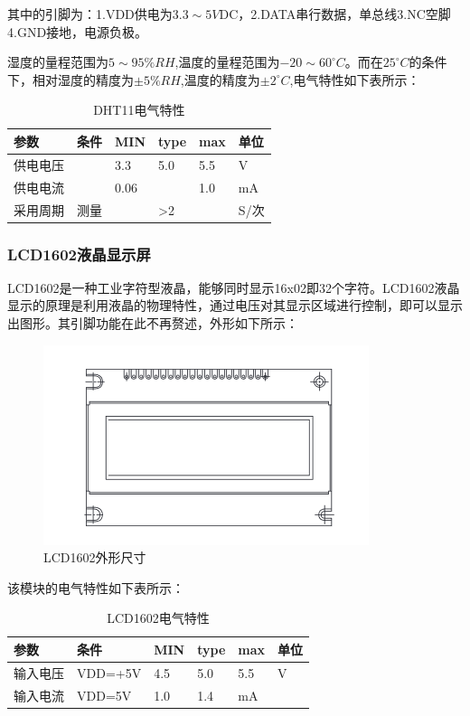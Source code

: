 \documentclass[a4paper, 11pt]{article} %
\begin{document}
\par{}其中的引脚为：1.VDD供电为$3.3\sim 5V$DC，2.DATA串行数据，单总线3.NC空脚4.GND接地，电源负极。
\par{} 湿度的量程范围为$5\sim 95 \%RH$,温度的量程范围为$-20\sim 60^{\circ}C$。而在$25^{\circ}C$的条件下，相对湿度的精度为$\pm 5\%RH$,温度的精度为$\pm 2^{\circ}C$,电气特性如下表所示：
\begin{table}[H]
  \centering
  \label{tab3}
  \begin{threeparttable}
    \small
    \begin{tabular} {p{70pt}p{70pt}p{70pt}p{70pt}p{70pt}p{70pt}}
      \hline
      参数&条件&MIN&type&max&单位\\
      \hline
      供电电压&&3.3&5.0&5.5&V\\
      供电电流&&0.06&&1.0&mA\\
      采用周期&测量&&>2&&S/次\\
      \hline
    \end{tabular}
    \small
  \end{threeparttable}
  \caption{DHT11电气特性}
\end{table}

\subsubsection{LCD1602液晶显示屏}
\par{} LCD1602是一种工业字符型液晶，能够同时显示16x02即32个字符。LCD1602液晶显示的原理是利用液晶的物理特性，通过电压对其显示区域进行控制，即可以显示出图形。其引脚功能在此不再赘述，外形如下所示：

\begin{figure}[H]
  \centering
  \includegraphics[scale = 0.58 ]{1-8.png}
  \caption{LCD1602外形尺寸}
  \label{img9} 
\end{figure}

\par{} 该模块的电气特性如下表所示：
\begin{table}[H]
  \centering
  \label{tab4}
  \begin{threeparttable}
    \small
    \begin{tabular} {p{70pt}p{70pt}p{70pt}p{70pt}p{70pt}p{70pt}}
      \hline
      参数&条件&MIN&type&max&单位\\
      \hline
      输入电压&VDD=+5V&4.5&5.0&5.5&V\\
      输入电流&VDD=5V&1.0&1.4&mA\\
      \hline
    \end{tabular}
    \small
  \end{threeparttable}
  \caption{LCD1602电气特性}
\end{table}
\end{document}
